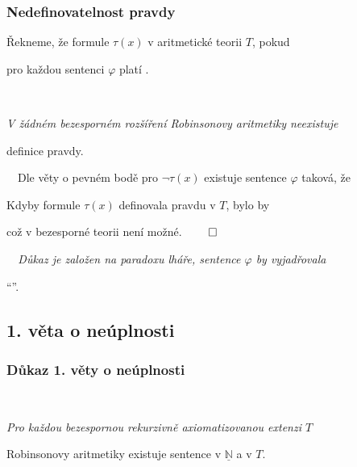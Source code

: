     \subsubsection*{Nedefinovatelnost pravdy}
    
    Řekneme, že formule $\tau(x)$  v aritmetické teorii $T$, pokud
    \smallskip
    
    pro každou sentenci $\varphi$ platí .
    \medskip
    
    \smallskip
    
    {\bf {}}\ \ {\it V žádném bezesporném rozšíření Robinsonovy aritmetiky neexistuje
    \smallskip
    
    definice pravdy.}
    \medskip
    
    \ \ Dle věty o pevném bodě pro $\neg\tau(x)$ existuje sentence $\varphi$ taková, že
    
    
    
    Kdyby formule $\tau(x)$ definovala pravdu v $T$, bylo by
    
    
    
    což v bezesporné teorii není možné. $\qed$
    \medskip
    
    \smallskip
    
    {\it {}\ \ Důkaz je založen na paradoxu lháře, sentence $\varphi$ by vyjadřovala
    \smallskip
    
    ``''.}
    
    
    
    \subsection*{1. věta o neúplnosti}
    \subsubsection*{Důkaz 1. věty o neúplnosti}
    \ \ {\it Pro každou bezespornou rekurzivně axiomatizovanou extenzi $T$
    
    
    Robinsonovy aritmetiky existuje sentence  v $\underline{\mathbb{N}}$ a  v $T$.}
    \medskip
    
